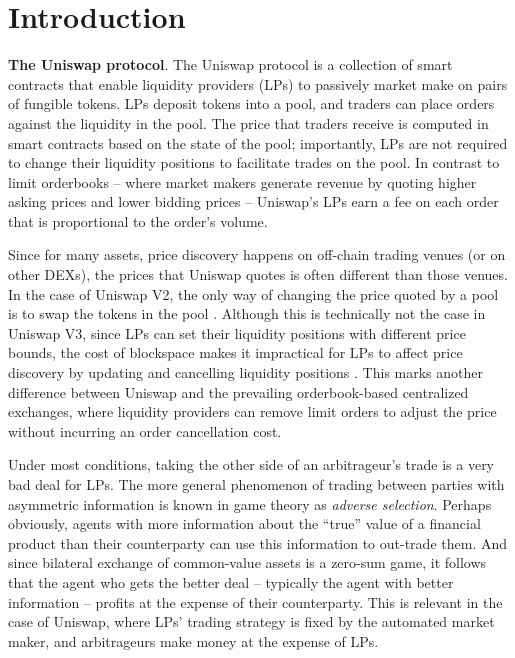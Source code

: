 \section{Introduction} \label{section:intro}

    \textbf{The Uniswap protocol}.
        The Uniswap protocol is a collection of smart contracts that enable liquidity providers (LPs) to passively market make on pairs of fungible tokens. LPs deposit tokens into a pool, and traders can place orders against the liquidity in the pool. The price that traders receive is computed in smart contracts based on the state of the pool; importantly, LPs are not required to change their liquidity positions to facilitate trades on the pool. In contrast to limit orderbooks -- where market makers generate revenue by quoting higher asking prices and lower bidding prices -- Uniswap's LPs earn a fee on each order that is proportional to the order's volume.

        Since for many assets, price discovery happens on off-chain trading venues (or on other DEXs), the prices that Uniswap quotes is often different than those venues. In the case of Uniswap V2, the only way of changing the price quoted by a pool is to swap the tokens in the pool \cite{v2Core}. Although this is technically not the case in Uniswap V3, since LPs can set their liquidity positions with different price bounds, the cost of blockspace makes it impractical for LPs to affect price discovery by updating and cancelling liquidity positions \cite{v3Core}. This marks another difference between Uniswap and the prevailing orderbook-based centralized exchanges, where liquidity providers can remove limit orders to adjust the price without incurring an order cancellation cost.

        Under most conditions, taking the other side of an arbitrageur's trade is a very bad deal for LPs. The more general phenomenon of trading between parties with asymmetric information is known in game theory as \textit{adverse selection}. %
        Perhaps obviously, agents with more information about the ``true'' value of a financial product than their counterparty can use this information to out-trade them. 
        And since bilateral exchange of common-value assets is a zero-sum game, %
        it follows that the agent who gets the better deal -- typically the agent with better information -- profits at the expense of their counterparty. This is relevant in the case of Uniswap, where LPs' trading strategy is fixed by the automated market maker, and arbitrageurs make money at the expense of LPs. %
        
